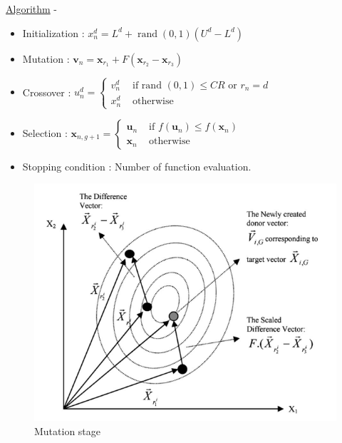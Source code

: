 \begin{frame}[allowframebreaks]{\underline{Algorithm} -}
{\begin{itemize}
\item Initialization : \(x_{n}^{d}=L^{d}+\operatorname{rand}(0,1)\left(U^{d}-L^{d}\right)\)
\item Mutation : \(\mathbf{v}_{n}=\mathbf{x}_{r_{1}}+F\left(\mathbf{x}_{r_{2}}-\mathbf{x}_{r_{3}}\right)\)
\item Crossover : \(u_{n}^{d}=\left\{\begin{array}{ll}{v_{n}^{d}} & {\text { if rand }(0,1) \leq C R \text { or } r_{n}=d} \\ {x_{n}^{d}} & {\text { otherwise }}\end{array}\right.\)
\item Selection : \(\mathbf{x}_{n,g+1}=\left\{\begin{array}{ll}{\mathbf{u}_{n}} & {\text { if } f\left(\mathbf{u}_{n}\right) \leq f\left(\mathbf{x}_{n}\right)} \\ {\mathbf{x}_{n}} & {\text { otherwise }}\end{array}\right.\)
\item Stopping condition : Number of function evaluation.
\end{itemize}
}
\parbox{0.31\linewidth}{
\begin{figure}
    \includegraphics[scale= 0.18]{figures/Mutation.png}
    \caption{Mutation stage \cite{storn}}
    \label{Mutation}
    

\end{figure}}
\end{frame}
